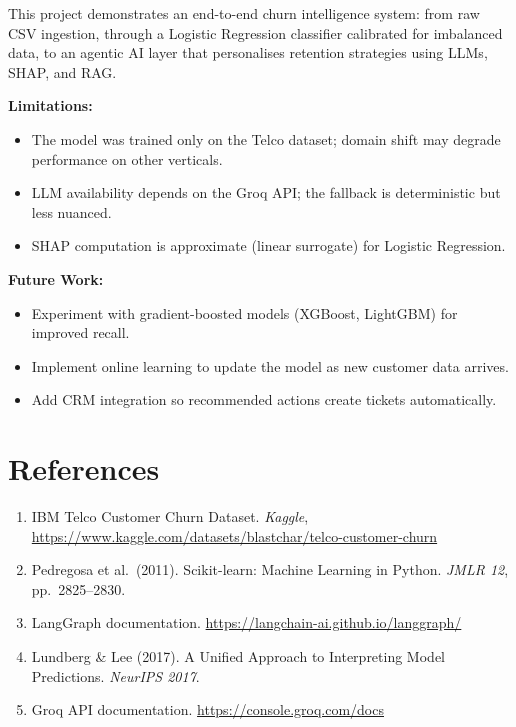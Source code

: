 \documentclass[12pt]{article}
\begin{document}
This project demonstrates an end-to-end churn intelligence system: from
raw CSV ingestion, through a Logistic Regression classifier calibrated for
imbalanced data, to an agentic AI layer that personalises retention
strategies using LLMs, SHAP, and RAG.

\textbf{Limitations:}
\begin{itemize}
  \item The model was trained only on the Telco dataset; domain shift may
        degrade performance on other verticals.
  \item LLM availability depends on the Groq API; the fallback is
        deterministic but less nuanced.
  \item SHAP computation is approximate (linear surrogate) for
        Logistic Regression.
\end{itemize}

\textbf{Future Work:}
\begin{itemize}
  \item Experiment with gradient-boosted models (XGBoost, LightGBM) for
        improved recall.
  \item Implement online learning to update the model as new customer data
        arrives.
  \item Add CRM integration so recommended actions create tickets
        automatically.
\end{itemize}

\section{References}

\begin{enumerate}
  \item IBM Telco Customer Churn Dataset.
        \textit{Kaggle}, \url{https://www.kaggle.com/datasets/blastchar/telco-customer-churn}
  \item Pedregosa et al.\ (2011). Scikit-learn: Machine Learning in Python.
        \textit{JMLR 12}, pp.\ 2825–2830.
  \item LangGraph documentation.
        \url{https://langchain-ai.github.io/langgraph/}
  \item Lundberg \& Lee (2017). A Unified Approach to Interpreting Model
        Predictions. \textit{NeurIPS 2017}.
  \item Groq API documentation.
        \url{https://console.groq.com/docs}
\end{enumerate}
\end{document}

